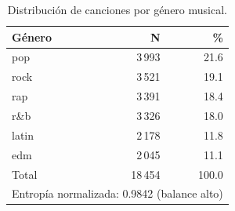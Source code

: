 \begin{table}[htbp]
\centering
\caption{Distribución de canciones por género musical.}
\label{tab:genre_distribution}
\begin{tabular}{lrr}
\toprule
Género & N & \% \\
\midrule
pop & 3\,993 & 21.6 \\
rock & 3\,521 & 19.1 \\
rap & 3\,391 & 18.4 \\
r\&b & 3\,326 & 18.0 \\
latin & 2\,178 & 11.8 \\
edm & 2\,045 & 11.1 \\
\midrule
Total & 18\,454 & 100.0 \\
\multicolumn{3}{l}{Entropía normalizada: 0.9842 (balance alto)} \\
\bottomrule
\end{tabular}
\end{table}